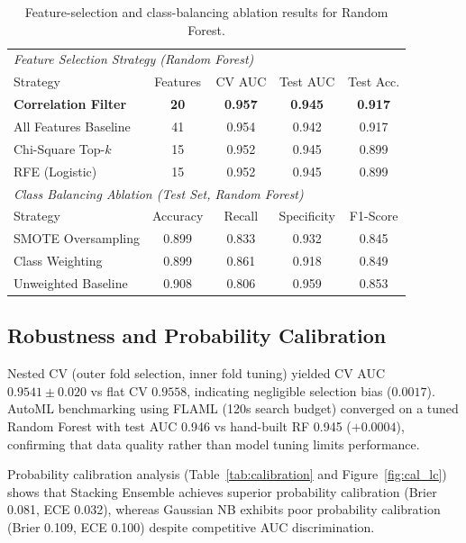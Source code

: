 \documentclass[10pt,twocolumn,a4paper]{article}
\begin{document}
\begin{table}[t]
\centering
\caption{Feature-selection and class-balancing ablation results for Random Forest.}
\label{tab:fsel}
\vspace{2pt}
\setlength{\tabcolsep}{2pt}
\footnotesize
\begin{tabular}{@{}l c c c c@{}}
\toprule
\multicolumn{5}{l}{\textit{Feature Selection Strategy (Random Forest)}} \\
Strategy & Features & CV AUC & Test AUC & Test Acc. \\
\midrule
\textbf{Correlation Filter} & \textbf{20} & \textbf{0.957} & \textbf{0.945} & \textbf{0.917} \\
All Features Baseline       & 41          & 0.954          & 0.942          & 0.917 \\
Chi-Square Top-$k$          & 15          & 0.952          & 0.945          & 0.899 \\
RFE (Logistic)              & 15          & 0.952          & 0.945          & 0.899 \\
\midrule
\multicolumn{5}{l}{\textit{Class Balancing Ablation (Test Set, Random Forest)}} \\
Strategy & Accuracy & Recall & Specificity & F1-Score \\
\midrule
SMOTE Oversampling  & 0.899 & 0.833 & 0.932 & 0.845 \\
Class Weighting     & 0.899 & 0.861 & 0.918 & 0.849 \\
Unweighted Baseline & 0.908 & 0.806 & 0.959 & 0.853 \\
\bottomrule
\end{tabular}
\end{table}

\subsection{Robustness and Probability Calibration}
Nested CV (outer fold selection, inner fold tuning) yielded CV AUC $0.9541 \pm 0.020$ vs flat CV $0.9558$, indicating negligible selection bias ($0.0017$).
AutoML benchmarking using FLAML (120s search budget) converged on a tuned Random Forest with test AUC 0.946 vs hand-built RF 0.945 ($+0.0004$),
confirming that data quality rather than model tuning limits performance.

Probability calibration analysis (Table~\ref{tab:calibration} and Figure~\ref{fig:cal_lc}) shows that Stacking Ensemble achieves superior probability calibration
(Brier 0.081, ECE 0.032), whereas Gaussian NB exhibits poor probability calibration (Brier 0.109, ECE 0.100) despite competitive AUC discrimination.
\end{document}
